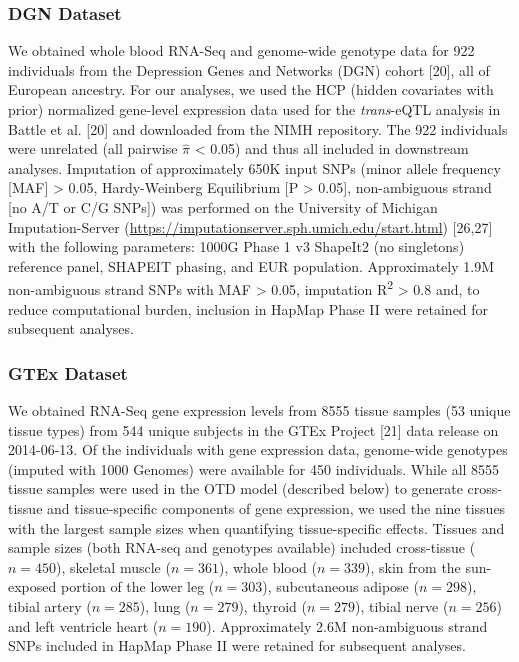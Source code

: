 \documentclass[]{article}
\begin{document}
\subsubsection{DGN Dataset}\label{dgn-dataset}

We obtained whole blood RNA-Seq and genome-wide genotype data for 922
individuals from the Depression Genes and Networks (DGN) cohort
{[}20{]}, all of European ancestry. For our analyses, we used the HCP
(hidden covariates with prior) normalized gene-level expression data
used for the \emph{trans}-eQTL analysis in Battle et al. {[}20{]} and
downloaded from the NIMH repository. The 922 individuals were unrelated
(all pairwise \(\hat{\pi}\) \textless{} 0.05) and thus all included in
downstream analyses. Imputation of approximately 650K input SNPs (minor
allele frequency {[}MAF{]} \textgreater{} 0.05, Hardy-Weinberg
Equilibrium {[}P \textgreater{} 0.05{]}, non-ambiguous strand {[}no A/T
or C/G SNPs{]}) was performed on the University of Michigan
Imputation-Server
(\url{https://imputationserver.sph.umich.edu/start.html}) {[}26,27{]}
with the following parameters: 1000G Phase 1 v3 ShapeIt2 (no singletons)
reference panel, SHAPEIT phasing, and EUR population. Approximately 1.9M
non-ambiguous strand SNPs with MAF \textgreater{} 0.05, imputation
R\textsuperscript{2} \textgreater{} 0.8 and, to reduce computational
burden, inclusion in HapMap Phase II were retained for subsequent
analyses.

\subsubsection{GTEx Dataset}\label{gtex-dataset}

We obtained RNA-Seq gene expression levels from 8555 tissue samples (53
unique tissue types) from 544 unique subjects in the GTEx Project
{[}21{]} data release on 2014-06-13. Of the individuals with gene
expression data, genome-wide genotypes (imputed with 1000 Genomes) were
available for 450 individuals. While all 8555 tissue samples were used
in the OTD model (described below) to generate cross-tissue and
tissue-specific components of gene expression, we used the nine tissues
with the largest sample sizes when quantifying tissue-specific effects.
Tissues and sample sizes (both RNA-seq and genotypes available) included
cross-tissue (\(n=450\)), skeletal muscle (\(n=361\)), whole blood
(\(n=339\)), skin from the sun-exposed portion of the lower leg
(\(n=303\)), subcutaneous adipose (\(n=298\)), tibial artery
(\(n=285\)), lung (\(n=279\)), thyroid (\(n=279\)), tibial nerve
(\(n=256\)) and left ventricle heart (\(n=190\)). Approximately 2.6M
non-ambiguous strand SNPs included in HapMap Phase II were retained for
subsequent analyses.
\end{document}
